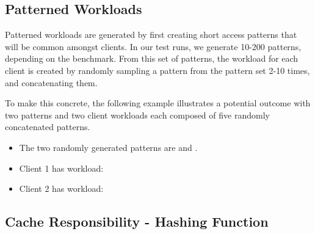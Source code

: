 \documentclass[sigconf]{acmart}
\begin{document}
\subsection{Patterned Workloads}
\label{sec:patternedworkloads}

Patterned workloads are generated by first creating short access patterns that will be common amongst clients. In our test runs, we generate 10-200 patterns, depending on the benchmark. From this set of patterns, the workload for each client is created by randomly sampling a pattern from the pattern set 2-10 times, and concatenating them. 


To make this concrete, the following example illustrates a potential outcome with two patterns and two client workloads each composed of five randomly concatenated patterns.
\begin{itemize}
    \item The two randomly generated patterns are {} and {}.
    \item Client 1 has workload: {}
    \item Client 2 has workload: {}
\end{itemize}

\subsection{Cache Responsibility - Hashing Function}
\label{sec:hash}
\end{document}
